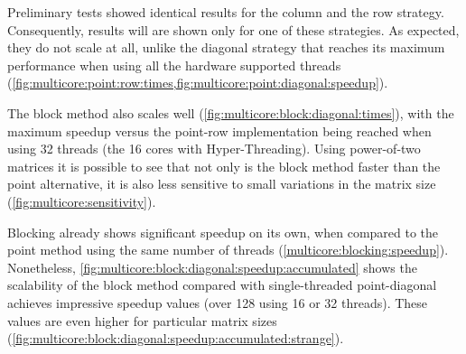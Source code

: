 \documentclass[../thesis]{subfiles}
\begin{document}
	Preliminary tests showed identical results for the column and the row strategy. Consequently, results will are shown only for one of these strategies. As expected, they do not scale at all, unlike the diagonal strategy that reaches its maximum performance when using all the hardware supported threads (\cref{fig:multicore:point:row:times,fig:multicore:point:diagonal:speedup}).

	The block method also scales well (\cref{fig:multicore:block:diagonal:times}), with the maximum speedup versus the point-row implementation being reached when using 32 threads (the 16 cores with Hyper-Threading). Using power-of-two matrices it is possible to see that not only is the block method faster than the point alternative, it is also less sensitive to small variations in the matrix size (\cref{fig:multicore:sensitivity}).


	Blocking already shows significant speedup on its own, when compared to the point method using the same number of threads (\cref{multicore:blocking:speedup}). Nonetheless, \cref{fig:multicore:block:diagonal:speedup:accumulated} shows the scalability of the block method compared with single-threaded point-diagonal achieves impressive speedup values (over 128 using 16 or 32 threads). These values are even higher for particular matrix sizes (\cref{fig:multicore:block:diagonal:speedup:accumulated:strange}).
\end{document}
